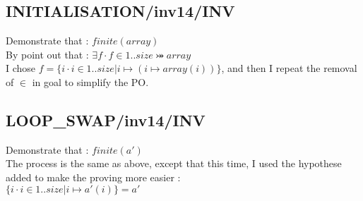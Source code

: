 \subsection{INITIALISATION/inv14/INV}
Demonstrate that : $finite(array)$ \\
By point out that : $\exists f \cdot f \in 1..size \bij array$ \\
I chose $f = \{i \cdot i\in 1..size | i \mapsto (i \mapsto array(i)) \}$, and then I repeat the removal of $\in$ in goal to simplify the PO.

\subsection{LOOP\_SWAP/inv14/INV}
Demonstrate that : $finite(a')$ \\
The process is the same as above, except that this time, I used the hypothese added to make the proving more easier : \\
$\{i \cdot i \in 1..size | i \mapsto a'(i)\} = a'$











